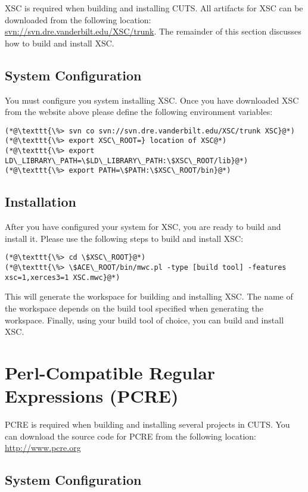 XSC is required when building and installing CUTS. All artifacts
for XSC can be downloaded from the following location: 
\url{svn://svn.dre.vanderbilt.edu/XSC/trunk}. The remainder of this section
discusses how to build and install XSC.

\subsection{System Configuration}

You must configure you system installing XSC. Once you have downloaded 
XSC from the website above please define the following environment variables:
\begin{lstlisting}
(*@\texttt{\%> svn co svn://svn.dre.vanderbilt.edu/XSC/trunk XSC}@*)
(*@\texttt{\%> export XSC\_ROOT=} location of XSC@*)
(*@\texttt{\%> export LD\_LIBRARY\_PATH=\$LD\_LIBRARY\_PATH:\$XSC\_ROOT/lib}@*)
(*@\texttt{\%> export PATH=\$PATH:\$XSC\_ROOT/bin}@*)
\end{lstlisting}

\subsection{Installation}

After you have configured your system for XSC, you are ready to build and 
install it. Please use the following steps to build and install XSC:
\begin{lstlisting}
(*@\texttt{\%> cd \$XSC\_ROOT}@*)
(*@\texttt{\%> \$ACE\_ROOT/bin/mwc.pl -type [build tool] -features xsc=1,xerces3=1 XSC.mwc}@*)
\end{lstlisting}
This will generate the workspace for building and installing XSC. The name of 
the workspace depends on the build tool specified when generating the 
workspace. Finally, using your build tool of choice, you can build and 
install XSC.

\section{Perl-Compatible Regular Expressions (PCRE)}
\label{sec:thirdparty-pcre}

PCRE is required when building and installing several projects in CUTS. 
You can download the source code for PCRE from the following 
location: \url{http://www.pcre.org}

\subsection{System Configuration}

